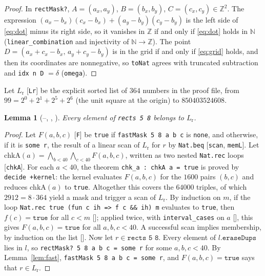 \documentclass[11pt]{amsart}
\theoremstyle{plain}
\newtheorem{lemma}[theorem]{Lemma}
\theoremstyle{definition}
\newcommand{\Z}{\mathbb{Z}}
\newcommand{\N}{\mathbb{N}}
\newcommand{\Lr}{L_{\mathrm{r}}}
\begin{document}
\begin{proof}
In \texttt{rectMask?}, $A=(a_x,a_y)$, $B=(b_x,b_y)$, $C=(c_x,c_y)\in\Z^2$. The expression $(a_x-b_x)(c_x-b_x)+(a_y-b_y)(c_y-b_y)$ is the left side of \eqref{eq:dot} minus its right side, so it vanishes in $\Z$ if and only if \eqref{eq:dot} holds in $\N$ (\texttt{linear\_combination} and injectivity of $\N\to\Z$). The point $D=(a_x+c_x-b_x,\,a_y+c_y-b_y)$ is in the grid if and only if \eqref{eq:grid} holds, and then its coordinates are nonnegative, so \texttt{toNat} agrees with truncated subtraction and \texttt{idx n D} $=\delta$ (\texttt{omega}).
\end{proof}

Let $\Lr$ [\texttt{Lr}] be the explicit sorted list of $364$ numbers in the proof file, from $99=2^0+2^1+2^5+2^6$ (the unit square at the origin) to $850403524608$.

\begin{lemma}[--, , ]\label{lem:cover}
Every element of \texttt{rects 5 8} belongs to $\Lr$.
\end{lemma}

\begin{proof}
Let $F(a,b,c)$ [\texttt{F}] be \texttt{true} if \texttt{fastMask 5 8 a b c} is \texttt{none}, and otherwise, if it is \texttt{some r}, the result of a linear scan of $\Lr$ for $r$ by \texttt{Nat.beq} [\texttt{scan}, \texttt{memL}]. Let $\mathrm{chkA}(a)=\bigwedge_{b<40}\bigwedge_{c<40}F(a,b,c)$, written as two nested \texttt{Nat.rec} loops [\texttt{chkA}].
For each $a<40$, the theorem \texttt{chk\_a : chkA a = true} is proved by \texttt{decide +kernel}: the kernel evaluates $F(a,b,c)$ for the $1600$ pairs $(b,c)$ and reduces $\mathrm{chkA}(a)$ to \texttt{true}. Altogether this covers the $64000$ triples, of which $2912=8\cdot364$ yield a mask and trigger a scan of $\Lr$.
By induction on $m$, if the loop \texttt{Nat.rec true (fun c ih => f c \&\& ih) m} evaluates to \texttt{true}, then $f(c)=\texttt{true}$ for all $c<m$ []; applied twice, with \texttt{interval\_cases} on $a$ [], this gives $F(a,b,c)=\texttt{true}$ for all $a,b,c<40$. A successful scan implies membership, by induction on the list [].
Now let $r\in\texttt{rects 5 8}$. Every element of $l.\texttt{eraseDups}$ lies in $l$, so \texttt{rectMask?\ 5 8 a b c = some r} for some $a,b,c<40$. By Lemma~\ref{lem:fast}, \texttt{fastMask 5 8 a b c = some r}, and $F(a,b,c)=\texttt{true}$ says that $r\in\Lr$.
\end{proof}
\end{document}
